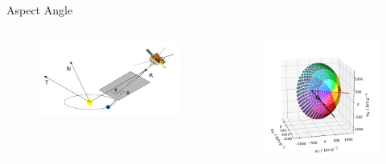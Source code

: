 \documentclass{beamer}
\begin{document}
\begin{frame}{Aspect Angle}
\begin{columns}
			\vspace{-2.8cm}
		\begin{figure}
			\includegraphics[scale=0.4]{Pics/RTN_AA_angles.pdf}
		\end{figure}
		\vspace{2cm}
	\column[]{1cm}
	\column[]{6cm}
		\vspace{1.cm}
	\begin{figure}
		\vfill
		\vspace{1.4cm}

		\includegraphics[scale=0.36]{Pics/col_aa_marker.png}
	\end{figure}
\end{columns}
\end{frame}
\end{document}
